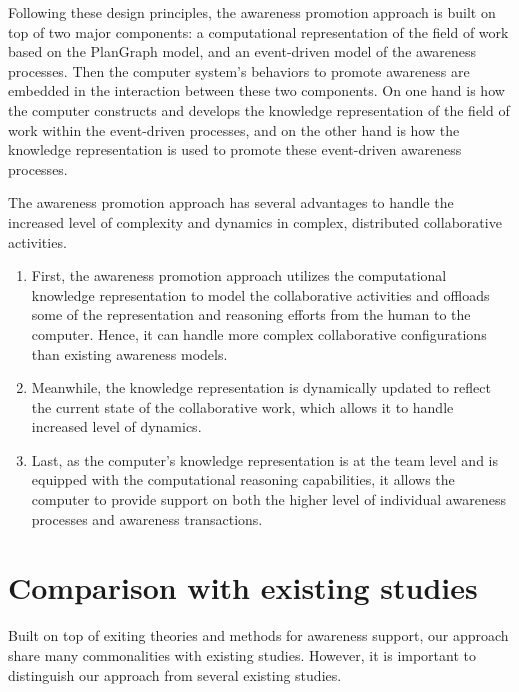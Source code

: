 Following these design principles, the awareness promotion approach is built on top of two major components: a computational representation of the field of work based on the PlanGraph model, and an event-driven model of the awareness processes. Then the computer system's behaviors to promote awareness are embedded in the interaction between these two components. On one hand is how the computer constructs and develops the knowledge representation of the field of work within the event-driven processes, and on the other hand is how the knowledge representation is used to promote these event-driven awareness processes.

The awareness promotion approach has several advantages to handle the increased level of complexity and dynamics in complex, distributed collaborative activities.

\begin{enumerate}
	\item First, the awareness promotion approach utilizes the computational knowledge representation to model the collaborative activities and offloads some of the representation and reasoning efforts from the human to the computer. Hence, it can  handle more complex collaborative configurations than existing awareness models.
	\item Meanwhile, the knowledge representation is dynamically updated to reflect the current state of the collaborative work, which allows it to handle increased level of dynamics.
	\item Last, as the computer's knowledge representation is at the team level and is equipped with the computational reasoning capabilities, it allows the computer to provide support on both the higher level of individual awareness processes and awareness transactions.
\end{enumerate}

\section{Comparison with existing studies} %
\label{sec:comparison_with_existing_studies}
Built on top of exiting theories and methods for awareness support, our approach share many commonalities with existing studies. However, it is important to distinguish our approach from several existing studies.

